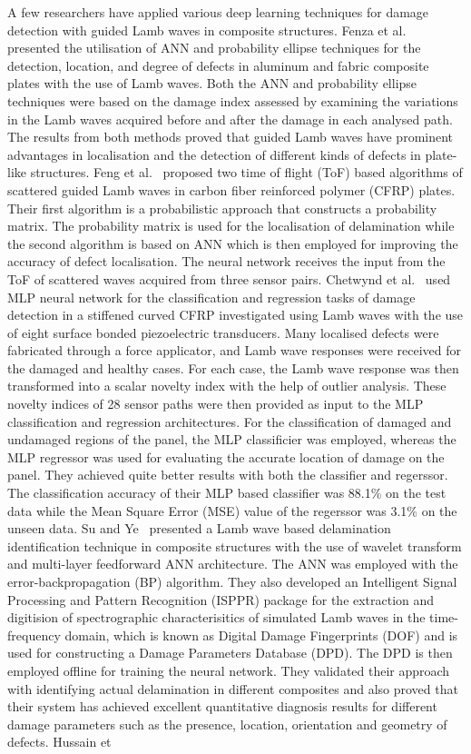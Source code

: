 A few researchers have applied various deep learning techniques for damage detection with guided Lamb waves in composite structures. Fenza et al.~\cite{de2015application} presented the utilisation of ANN and probability ellipse techniques for the detection, location, and degree of defects in aluminum and fabric composite plates with the use of Lamb waves. Both the ANN and probability ellipse techniques were based on the damage index assessed by examining the variations in the Lamb waves acquired before and after the damage in each analysed path. The results from both methods proved that guided Lamb waves have prominent advantages in localisation and the detection of different kinds of defects in plate-like structures. Feng et al.~\cite{feng2019locating} proposed two time of flight (ToF) based algorithms of scattered guided Lamb waves in carbon fiber reinforced polymer (CFRP) plates. Their first algorithm is a probabilistic approach that constructs a probability matrix. The probability matrix is used for the localisation of delamination while the second algorithm is based on ANN which is then employed for improving the accuracy of defect localisation. The neural network receives the input from the ToF of scattered waves acquired from three sensor pairs. Chetwynd et al.~\cite{chetwynd2008damage} used MLP neural network for the classification and regression tasks of damage detection in a stiffened curved CFRP investigated using Lamb waves with the use of eight surface bonded piezoelectric transducers. Many localised defects were fabricated through a force applicator, and Lamb wave responses were received for the damaged and healthy cases. For each case, the Lamb wave response was then transformed into a scalar novelty index with the help of outlier analysis. These novelty indices of 28 sensor paths were then provided as input to the MLP classification and regression architectures. For the classification of damaged and undamaged regions of the panel, the MLP classificier was employed, whereas the MLP regressor was used for evaluating the accurate location of damage on the panel. They achieved quite better results with both the classifier and regerssor. The classification accuracy of their MLP based classifier was 88.1\% on the test data while the Mean Square Error (MSE) value of the regerssor was 3.1\% on the unseen data. Su and Ye~\cite{su2004lamb} presented a Lamb wave based delamination identification technique in composite structures with the use of wavelet transform and multi-layer feedforward ANN architecture. The ANN was employed with the error-backpropagation (BP) algorithm. They also developed an Intelligent Signal Processing and Pattern Recognition (ISPPR) package for the extraction and digitision of spectrographic characterisitics of simulated Lamb waves in the time-frequency domain, which is known as Digital Damage Fingerprints (DOF) and is used for constructing a Damage Parameters Database (DPD). The DPD is then employed offline for training the neural network. They validated their approach with identifying actual delamination in different composites and also proved that their system has achieved excellent quantitative diagnosis results for different damage parameters such as the presence, location, orientation and geometry of defects. Hussain et 